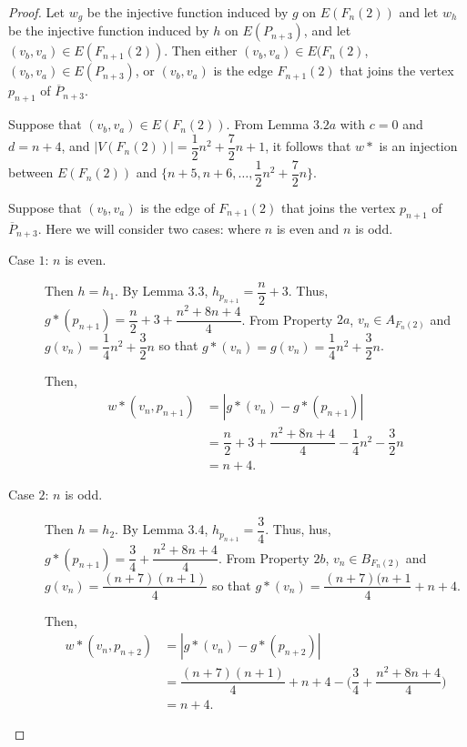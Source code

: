 \documentclass[12pt]{report}
\theoremstyle{definition}
\def\indent{\hspace*{.5cm}}
\begin{document}
\begin{proof}
	\indent Let $w_{g}$ be the injective function induced by $g$ on $E(F_{n}(2))$ and let $w_{h}$ be the injective function induced by $h$  on $E(P_{n+3})$, and let $(v_{b},v_{a})\in E(F_{n+1}(2))$. Then either $(v_{b},v_{a})\in E(F_{n}(2)$, $(v_{b},v_{a})\in E(P_{n+3})$, or $(v_{b},v_{a})$ is the edge $F_{n+1}(2)$ that joins the vertex $p_{n+1}$ of $\overline{P}_{n+3}$.
	
	\indent Suppose that $(v_{b},v_{a})\in E(F_{n}(2))$. From Lemma $3.2a$ with $c=0$ and $d=n+4$, and $|V(F_{n}(2))|=\dfrac{1}{2}n^2+\dfrac{7}{2}n+1$, it follows that $w\ast$ is an injection between $E(F_{n}(2))$ and $\bigg\{n+5,n+6,\ldots,\dfrac{1}{2}n^2+\dfrac{7}{2}n\bigg\}$.
	
	\indent Suppose that $(v_{b},v_{a})$ is the edge of $F_{n+1}(2)$ that joins the vertex $p_{n+1}$ of $\overline{P}_{n+3}$. Here we will consider two cases: where $n$ is even and $n$ is odd.
	
	\begin{description}
	    \item[Case $1$: $n$ is even.]
	  
	   Then $h=h_{1}$. By Lemma $3.3$, $h_{p_{n+1}}=\dfrac{n}{2}+3$. Thus, $g\ast(p_{n+1})=\dfrac{n}{2}+3+\dfrac{n^2+8n+4}{4}$. From Property $2a$, $v_{n}\in A_{F_{n}(2)}$ and $g(v_{n})=\dfrac{1}{4}n^2+\dfrac{3}{2}n$ so that $g\ast(v_{n})=g(v_{n})=\dfrac{1}{4}n^2+\dfrac{3}{2}n$.
	   
	   \indent Then,
	   \begin{equation*}
	       \begin{split}
	           w\ast(v_{n},p_{n+1}) &= |g\ast(v_{n})-g\ast(p_{n+1})|\\
	           &= \dfrac{n}{2}+3+\dfrac{n^2+8n+4}{4}-\dfrac{1}{4}n^2-\dfrac{3}{2}n\\
	           &= n+4.
	       \end{split}
	   \end{equation*}
	   
	 \item[Case $2$: $n$ is odd.]  \par
	 Then $h=h_{2}$. By Lemma $3.4$, $h_{p_{n+1}}=\dfrac{3}{4}$. Thus, hus, $g\ast(p_{n+1})=\dfrac{3}{4}+\dfrac{n^2+8n+4}{4}$. From Property $2b$, $v_{n}\in B_{F_{n}(2)}$ and $g(v_{n})=\dfrac{(n+7)(n+1)}{4}$ so that $g\ast(v_{n})=\dfrac{(n+7)(n+1}{4}+n+4$. 
	 
	 \indent Then,
	 \begin{equation*}
	     \begin{split}
	         w\ast(v_{n},p_{n+2}) &= |g\ast(v_{n})-g\ast(p_{n+2})|\\
	         &= \dfrac{(n+7)(n+1)}{4}+n+4-\bigg(\dfrac{3}{4}+\dfrac{n^2+8n+4}{4}\bigg)\\
	         &= n+4.
	     \end{split}
	 \end{equation*}
	 \end{description}
	

\end{proof}
\end{document}

